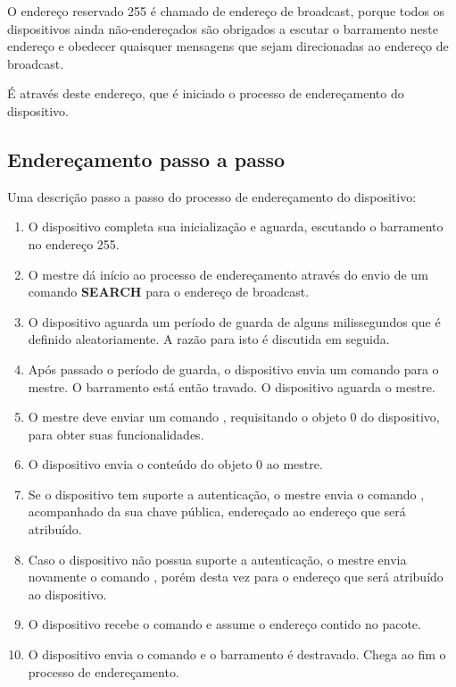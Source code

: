 \documentclass[11pt]{report}
\begin{document}
O endereço reservado 255 é chamado de endereço de broadcast, porque todos os dispositivos ainda não-endereçados são obrigados a escutar o barramento neste endereço e obedecer quaisquer mensagens que sejam direcionadas ao endereço de broadcast.

É através deste endereço, que é iniciado o processo de endereçamento do dispositivo.

\subsection{Endereçamento passo a passo}

Uma descrição passo a passo do processo de endereçamento do dispositivo:

\begin{enumerate}

\item O dispositivo completa sua inicialização e aguarda, escutando o barramento no endereço 255.
\item O mestre dá início ao processo de endereçamento através do envio de um comando \textbf{SEARCH} para o endereço de broadcast.
\item O dispositivo aguarda um período de guarda de alguns milissegundos que é definido aleatoriamente. A razão para isto é discutida em seguida.
\item Após passado o período de guarda, o dispositivo envia um comando  para o mestre. O barramento está então travado. O dispositivo aguarda o mestre.
\item O mestre deve enviar um comando , requisitando o objeto 0 do dispositivo, para obter suas funcionalidades.
\item O dispositivo envia o conteúdo do objeto 0 ao mestre.
\item Se o dispositivo tem suporte a autenticação, o mestre envia o comando , acompanhado da sua chave pública, endereçado ao endereço que será atribuído.
\item Caso o dispositivo não possua suporte a autenticação, o mestre envia novamente o comando , porém desta vez para o endereço que será atribuído ao dispositivo.
\item O dispositivo recebe o comando e assume o endereço contido no pacote.
\item O dispositivo envia o comando  e o barramento é destravado. Chega ao fim o processo de endereçamento.

\end{enumerate}
\end{document}
